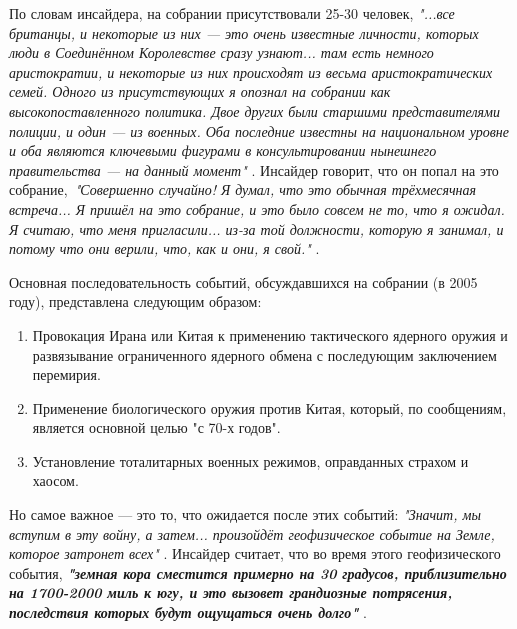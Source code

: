 \documentclass[10pt,twocolumn,letterpaper]{article}
\begin{document}
По словам инсайдера, на собрании присутствовали 25-30 человек, \textit{"...все британцы, и некоторые из них — это очень известные личности, которых люди в Соединённом Королевстве сразу узнают... там есть немного аристократии, и некоторые из них происходят из весьма аристократических семей. Одного из присутствующих я опознал на собрании как высокопоставленного политика. Двое других были старшими представителями полиции, и один — из военных. Оба последние известны на национальном уровне и оба являются ключевыми фигурами в консультировании нынешнего правительства — на данный момент"} \cite{4}. Инсайдер говорит, что он попал на это собрание,\ \textit{"Совершенно случайно! Я думал, что это обычная трёхмесячная встреча... Я пришёл на это собрание, и это было совсем не то, что я ожидал. Я считаю, что меня пригласили... из-за той должности, которую я занимал, и потому что они верили, что, как и они, я свой."} \cite{4}.

Основная последовательность событий, обсуждавшихся на собрании (в 2005 году), представлена следующим образом:

\begin{flushleft}
\begin{enumerate}
    \item Провокация Ирана или Китая к применению тактического ядерного оружия и развязывание ограниченного ядерного обмена с последующим заключением перемирия.
    \item Применение биологического оружия против Китая, который, по сообщениям, является основной целью "с 70-х годов".
    \item Установление тоталитарных военных режимов, оправданных страхом и хаосом.
\end{enumerate}
\end{flushleft}

Но самое важное — это то, что ожидается после этих событий: \textit{"Значит, мы вступим в эту войну, а затем... произойдёт геофизическое событие на Земле, которое затронет всех"} \cite{4}. Инсайдер считает, что во время этого геофизического события, \textit{\textbf{"земная кора сместится примерно на 30 градусов, приблизительно на 1700-2000 миль к югу, и это вызовет грандиозные потрясения, последствия которых будут ощущаться очень долго"}} \cite{4}.
\end{document}
